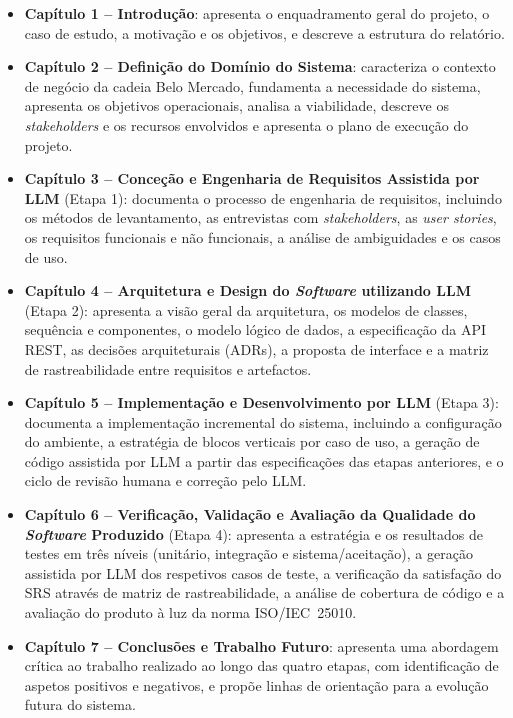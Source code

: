 \begin{itemize}
    \item \textbf{Capítulo 1 -- Introdução}: apresenta o enquadramento geral do projeto, o caso de estudo, a motivação e os objetivos, e descreve a estrutura do relatório.
    \item \textbf{Capítulo 2 -- Definição do Domínio do Sistema}: caracteriza o contexto de negócio da cadeia Belo Mercado, fundamenta a necessidade do sistema, apresenta os objetivos operacionais, analisa a viabilidade, descreve os \textit{stakeholders} e os recursos envolvidos e apresenta o plano de execução do projeto.
    \item \textbf{Capítulo 3 -- Conceção e Engenharia de Requisitos Assistida por LLM} (Etapa 1): documenta o processo de engenharia de requisitos, incluindo os métodos de levantamento, as entrevistas com \textit{stakeholders}, as \textit{user stories}, os requisitos funcionais e não funcionais, a análise de ambiguidades e os casos de uso.
    \item \textbf{Capítulo 4 -- Arquitetura e Design do \textit{Software} utilizando LLM} (Etapa 2): apresenta a visão geral da arquitetura, os modelos de classes, sequência e componentes, o modelo lógico de dados, a especificação da API REST, as decisões arquiteturais (ADRs), a proposta de interface e a matriz de rastreabilidade entre requisitos e artefactos.
    \item \textbf{Capítulo 5 -- Implementação e Desenvolvimento por LLM} (Etapa 3): documenta a implementação incremental do sistema, incluindo a configuração do ambiente, a estratégia de blocos verticais por caso de uso, a geração de código assistida por LLM a partir das especificações das etapas anteriores, e o ciclo de revisão humana e correção pelo LLM.
    \item \textbf{Capítulo 6 -- Verificação, Validação e Avaliação da Qualidade do \textit{Software} Produzido} (Etapa 4): apresenta a estratégia e os resultados de testes em três níveis (unitário, integração e sistema/aceitação), a geração assistida por LLM dos respetivos casos de teste, a verificação da satisfação do SRS através de matriz de rastreabilidade, a análise de cobertura de código e a avaliação do produto à luz da norma ISO/IEC~25010.
    \item \textbf{Capítulo 7 -- Conclusões e Trabalho Futuro}: apresenta uma abordagem crítica ao trabalho realizado ao longo das quatro etapas, com identificação de aspetos positivos e negativos, e propõe linhas de orientação para a evolução futura do sistema.
\end{itemize}